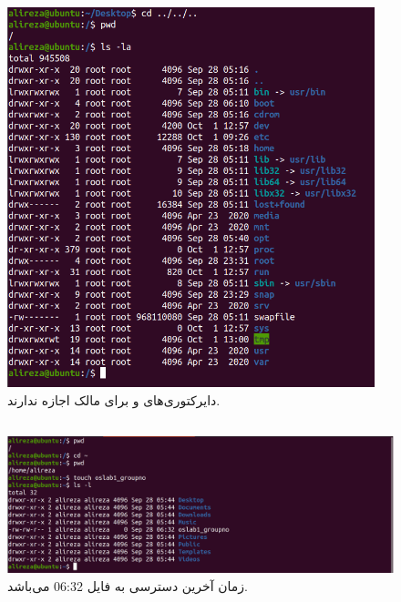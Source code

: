 \documentclass{article}
\begin{document}


\newpage

\section{}
\subsection{}
\begin{figure}[ht]
    \centering
    \includegraphics[width=0.95\textwidth]{figures/1.1.png}
    \caption
	{
دایرکتوری‌های
و
برای مالک اجازه
ندارند.
	}
    \label{fig:fig1}
\end{figure}
\FloatBarrier

\subsection{}
\begin{figure}[ht]
    \centering
    \includegraphics[width=1.0\textwidth]{figures/1.2.png}
    \caption
	{
زمان آخرین دسترسی به فایل 06:32 می‌باشد.
	}
    \label{fig:fig1}
\end{figure}
\FloatBarrier
\end{document}
